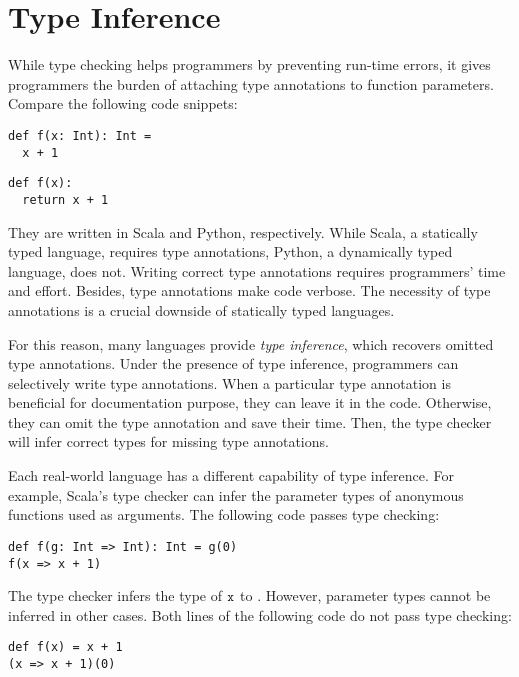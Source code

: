 
\chapter{Type Inference}

\renewcommand{\plang}{\textsf{TFAE}\xspace}
\renewcommand{\Lang}{\textsf{TIFAE}\xspace}

While type checking helps programmers by preventing run-time errors, it gives
programmers the burden of attaching type annotations to function parameters.
Compare the following code snippets:

\begin{verbatim}
def f(x: Int): Int =
  x + 1
\end{verbatim}

\begin{verbatim}
def f(x):
  return x + 1
\end{verbatim}

They are written in Scala and Python, respectively. While Scala, a statically
typed language, requires type annotations, Python, a dynamically typed language,
does not. Writing correct type annotations requires programmers' time and
effort. Besides, type annotations make code verbose. The necessity of type
annotations is a crucial downside of statically typed languages.

For this reason, many languages provide \textit{type inference}, which recovers omitted type annotations. Under the presence of type
inference, programmers can selectively write type annotations. When a particular
type annotation is beneficial for documentation purpose, they can leave it in
the code. Otherwise, they can omit the type annotation and save their time.
Then, the type checker will infer correct types for missing type annotations.

Each real-world language has a different capability of type inference. For
example, Scala's type checker can infer the parameter types of anonymous
functions used as arguments. The following code passes type checking:

\begin{verbatim}
def f(g: Int => Int): Int = g(0)
f(x => x + 1)
\end{verbatim}

The type checker infers the type of $\texttt{x}$ to . However, parameter
types cannot be inferred in other cases. Both lines of the following code do
not pass type checking:

\begin{verbatim}
def f(x) = x + 1
(x => x + 1)(0)
\end{verbatim}

